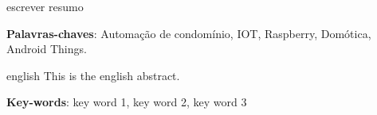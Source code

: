 \setlength{\absparsep}{18pt} %
\begin{resumo}

  escrever resumo

 \textbf{Palavras-chaves}: Automação de condomínio, IOT, Raspberry, Domótica, Android Things.
\end{resumo}

\begin{resumo}[Abstract]
 \begin{otherlanguage*}{english}
   This is the english abstract.

   \vspace{\onelineskip}

   \noindent
   \textbf{Key-words}: key word 1, key word 2, key word 3
 \end{otherlanguage*}
\end{resumo}
